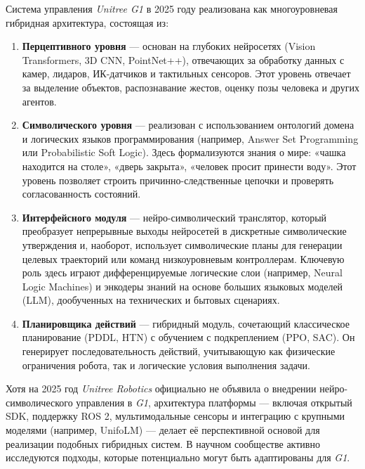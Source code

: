 Система управления \textit{Unitree G1} в 2025 году реализована как многоуровневая гибридная архитектура, состоящая из:

\begin{enumerate}
    \item \textbf{Перцептивного уровня} — основан на глубоких нейросетях (Vision Transformers, 3D CNN, PointNet++), отвечающих за обработку данных с камер, лидаров, ИК-датчиков и тактильных сенсоров. Этот уровень отвечает за выделение объектов, распознавание жестов, оценку позы человека и других агентов.
    \item \textbf{Символического уровня} — реализован с использованием онтологий домена и логических языков программирования (например, Answer Set Programming или Probabilistic Soft Logic). Здесь формализуются знания о мире: «чашка находится на столе», «дверь закрыта», «человек просит принести воду». Этот уровень позволяет строить причинно-следственные цепочки и проверять согласованность состояний.
    \item \textbf{Интерфейсного модуля} — нейро-символический транслятор, который преобразует непрерывные выходы нейросетей в дискретные символические утверждения и, наоборот, использует символические планы для генерации целевых траекторий или команд низкоуровневым контроллерам. Ключевую роль здесь играют дифференцируемые логические слои (например, Neural Logic Machines) и энкодеры знаний на основе больших языковых моделей (LLM), дообученных на технических и бытовых сценариях.
    \item \textbf{Планировщика действий} — гибридный модуль, сочетающий классическое планирование (PDDL, HTN) с обучением с подкреплением (PPO, SAC). Он генерирует последовательность действий, учитывающую как физические ограничения робота, так и логические условия выполнения задачи.
\end{enumerate}

Хотя на 2025 год \textit{Unitree Robotics} официально не объявила о внедрении нейро-символического управления в \textit{G1}, архитектура платформы — включая открытый SDK, поддержку ROS 2, мультимодальные сенсоры и интеграцию с крупными моделями (например, UnifoLM) — делает её перспективной основой для реализации подобных гибридных систем. В научном сообществе активно исследуются подходы, которые потенциально могут быть адаптированы для \textit{G1}.